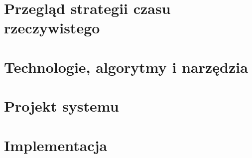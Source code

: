 \documentclass[nostrict]{Szablon}
\begin{document}




\chapter{Przegląd strategii czasu rzeczywistego}








\chapter{Technologie, algorytmy i narzędzia}

\chapter{Projekt systemu}











\chapter{Implementacja}








\end{document}
